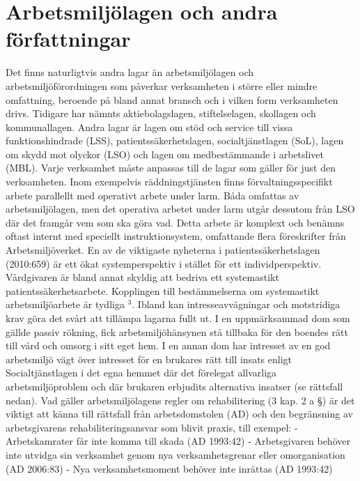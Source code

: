 \section*{Arbetsmiljölagen och andra författningar}
Det finns naturligtvis andra lagar än arbetsmiljölagen och arbetsmiljöförordningen som påverkar verksamheten i större eller mindre omfattning, beroende på bland annat bransch och i vilken form verksamheten drivs. Tidigare har nämnts aktiebolagslagen, stiftelselagen, skollagen och kommunallagen. Andra lagar är lagen om stöd och service till vissa funktionshindrade (LSS), patientssäkerhetslagen, socialtjänstlagen (SoL), lagen om skydd mot olyckor (LSO) och lagen om medbestämmande i arbetslivet (MBL). Varje verksamhet måste anpassas till de lagar som gäller för just den verksamheten.
Inom exempelvis räddningstjänsten finns förvaltningsspecifikt arbete parallellt med operativt arbete under larm. Båda omfattas av arbetsmiljölagen, men det operativa arbetet under larm utgår dessutom från LSO där det framgår vem som ska göra vad. Detta arbete är komplext och benämns oftast internt med speciellt instruktionsystem, omfattande flera föreskrifter från Arbetsmiljöverket.
En av de viktigaste nyheterna i patientssäkerhetslagen (2010:659) är ett ökat systemperspektiv i stället för ett individperspektiv. Vårdgivaren är bland annat skyldig att bedriva ett systemastikt patientssäkerhetsarbete. Kopplingen till bestämmelserna om systemastikt arbetsmiljöarbete är tydliga \({ }^{3}\).
Ibland kan intresseavvägningar och motstridiga krav göra det svårt att tillämpa lagarna fullt ut. I en uppmärksammad dom som gällde passiv rökning, fick arbetsmiljöhänsynen stå tillbaka för den boendes rätt till vård och omsorg i sitt eget hem. I en annan dom har intresset av en god arbetsmiljö vägt över intresset för en brukares rätt till insats enligt Socialtjänstlagen i det egna hemmet där det förelegat allvarliga arbetsmiljöproblem och där brukaren erbjudits alternativa insatser (se rättsfall nedan).
Vad gäller arbetsmiljölagens regler om rehabilitering (3 kap. 2 a §) är det viktigt att känna till rättsfall från arbetsdomstolen (AD) och den begränsning av arbetsgivarens rehabiliteringsansvar som blivit praxis, till exempel:
- Arbetskamrater får inte komma till skada (AD 1993:42)
- Arbetsgivaren behöver inte utvidga sin verksamhet genom nya verksamhetsgrenar eller omorganisation (AD 2006:83)
- Nya verksamhetsmoment behöver inte inrättas (AD 1993:42)

